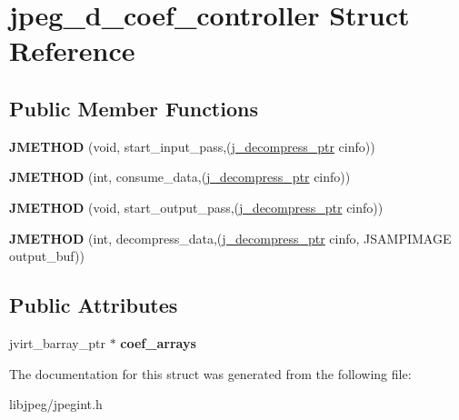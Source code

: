 \hypertarget{structjpeg__d__coef__controller}{\section{jpeg\-\_\-d\-\_\-coef\-\_\-controller Struct Reference}
\label{structjpeg__d__coef__controller}
}
\subsection*{Public Member Functions}
\begin{DoxyCompactItemize}
\item 
\hypertarget{structjpeg__d__coef__controller_ab4b18cfac761c7186363a845e36f342c}{{\bfseries J\-M\-E\-T\-H\-O\-D} (void, start\-\_\-input\-\_\-pass,(\hyperlink{structjpeg__decompress__struct}{j\-\_\-decompress\-\_\-ptr} cinfo))}\label{structjpeg__d__coef__controller_ab4b18cfac761c7186363a845e36f342c}

\item 
\hypertarget{structjpeg__d__coef__controller_a4c0e8d307e0852eae338a0f4f3c96edb}{{\bfseries J\-M\-E\-T\-H\-O\-D} (int, consume\-\_\-data,(\hyperlink{structjpeg__decompress__struct}{j\-\_\-decompress\-\_\-ptr} cinfo))}\label{structjpeg__d__coef__controller_a4c0e8d307e0852eae338a0f4f3c96edb}

\item 
\hypertarget{structjpeg__d__coef__controller_addb7a363607be97630bf37175267fd58}{{\bfseries J\-M\-E\-T\-H\-O\-D} (void, start\-\_\-output\-\_\-pass,(\hyperlink{structjpeg__decompress__struct}{j\-\_\-decompress\-\_\-ptr} cinfo))}\label{structjpeg__d__coef__controller_addb7a363607be97630bf37175267fd58}

\item 
\hypertarget{structjpeg__d__coef__controller_a5d61ba56d9f5d8de0662df091aa6d9e1}{{\bfseries J\-M\-E\-T\-H\-O\-D} (int, decompress\-\_\-data,(\hyperlink{structjpeg__decompress__struct}{j\-\_\-decompress\-\_\-ptr} cinfo, J\-S\-A\-M\-P\-I\-M\-A\-G\-E output\-\_\-buf))}\label{structjpeg__d__coef__controller_a5d61ba56d9f5d8de0662df091aa6d9e1}

\end{DoxyCompactItemize}
\subsection*{Public Attributes}
\begin{DoxyCompactItemize}
\item 
\hypertarget{structjpeg__d__coef__controller_a6611f9e18fbbbb13d117caadb5d14dc1}{jvirt\-\_\-barray\-\_\-ptr $\ast$ {\bfseries coef\-\_\-arrays}}\label{structjpeg__d__coef__controller_a6611f9e18fbbbb13d117caadb5d14dc1}

\end{DoxyCompactItemize}


The documentation for this struct was generated from the following file\-:\begin{DoxyCompactItemize}
\item 
libjpeg/jpegint.\-h\end{DoxyCompactItemize}
